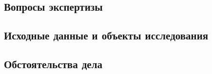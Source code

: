 \documentclass[a4paper,12pt,english,notitlepage]{report}
\begin{document}
%	
%
\pagestyle{plain}



\pagestyle{fancy}
\frenchspacing 
\fancyhf{}
\fancyhead{}
\fancyfoot{} 
%
%
%
%
\fancyhead[RE]{ } %
\fancyhead{}
\fancyhead[RE]{\small \NomerDoc} %
%

\fancyfoot[R]{\textcolor{black}{ \textit{{\small }} \rule{3cm}{0.1 mm}}}

\fancyfoot[CE]{\thepage}%
\fancyfoot[CO]{\thepage}


%
\renewcommand{\headrulewidth}{0 mm}%
\renewcommand{\headrule}{\hbox to\headwidth{%
		\color{red}\leaders\hrule height \headrulewidth\hfill}}

\renewcommand{\footrulewidth}{0 mm}%
\futurelet\TMPfootrule\def\footrule{{\color{black}\TMPfootrule}}
%
%
\thispagestyle{empty}  %
%

%






\subsection{Вопросы экспертизы}


\subsection{Исходные данные и объекты исследования}



\subsection{Обстоятельства дела}

\end{document}
